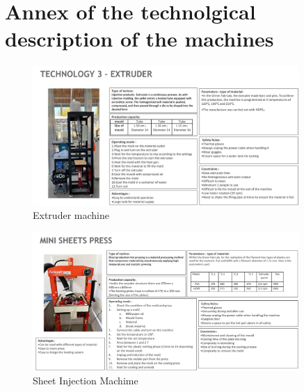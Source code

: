 \documentclass[
  11pt,
]{article}
\begin{document}
\newpage

\appendix

\hypertarget{annex-of-the-technolgical-description-of-the-machines}{%
\section{Annex of the technolgical description of the
machines}\label{annex-of-the-technolgical-description-of-the-machines}}

\begin{figure}[H]

{\centering \includegraphics[width=0.9\textwidth,height=\textheight]{figures/Annex/Extruder.jpg}

}

\caption{\label{fig-fff}Extruder machine}

\end{figure}

\begin{figure}[H]

{\centering \includegraphics[width=0.9\textwidth,height=\textheight]{figures/Annex/Sheetpresse.jpg.png}

}

\caption{\label{fig-fff}Sheet Injection Machime}

\end{figure}
\end{document}
